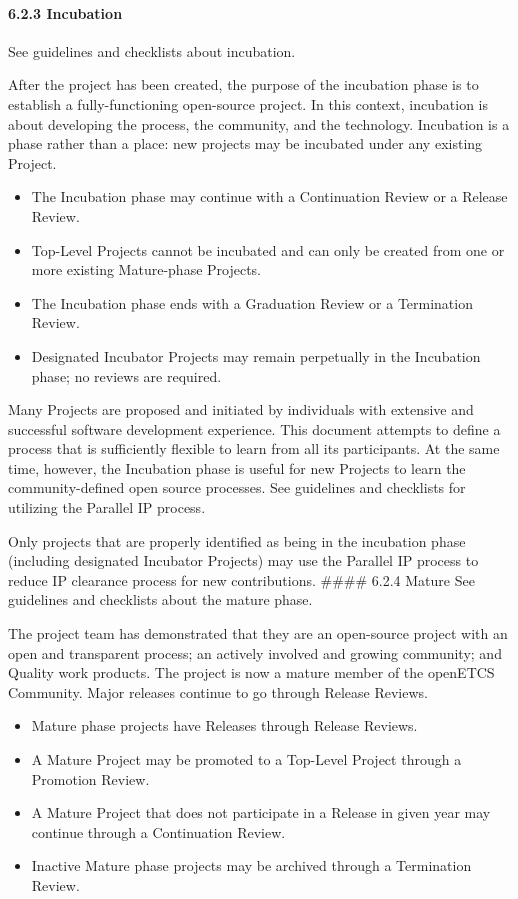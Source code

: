 \paragraph{6.2.3 Incubation}\label{incubation}

See guidelines and checklists about incubation.

After the project has been created, the purpose of the incubation phase
is to establish a fully-functioning open-source project. In this
context, incubation is about developing the process, the community, and
the technology. Incubation is a phase rather than a place: new projects
may be incubated under any existing Project.

\begin{itemize}

\item
  The Incubation phase may continue with a Continuation Review or a
  Release Review.
\item
  Top-Level Projects cannot be incubated and can only be created from
  one or more existing Mature-phase Projects.
\item
  The Incubation phase ends with a Graduation Review or a Termination
  Review.
\item
  Designated Incubator Projects may remain perpetually in the Incubation
  phase; no reviews are required.
\end{itemize}

Many Projects are proposed and initiated by individuals with extensive
and successful software development experience. This document attempts
to define a process that is sufficiently flexible to learn from all its
participants. At the same time, however, the Incubation phase is useful
for new Projects to learn the community-defined open source processes.
See guidelines and checklists for utilizing the Parallel IP process.

Only projects that are properly identified as being in the incubation
phase (including designated Incubator Projects) may use the Parallel IP
process to reduce IP clearance process for new contributions. \#\#\#\#
6.2.4 Mature See guidelines and checklists about the mature phase.

The project team has demonstrated that they are an open-source project
with an open and transparent process; an actively involved and growing
community; and Quality work products. The project is now a mature member
of the openETCS Community. Major releases continue to go through Release
Reviews.

\begin{itemize}

\item
  Mature phase projects have Releases through Release Reviews.
\item
  A Mature Project may be promoted to a Top-Level Project through a
  Promotion Review.
\item
  A Mature Project that does not participate in a Release in given year
  may continue through a Continuation Review.
\item
  Inactive Mature phase projects may be archived through a Termination
  Review.
\end{itemize}

